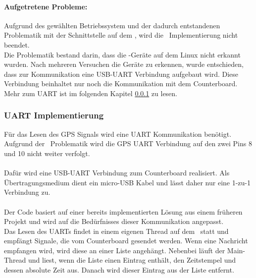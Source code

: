\paragraph{Aufgetretene Probleme:}
Aufgrund des gewählten Betriebssystem und der dadurch entstandenen Problematik mit der Schnittstelle auf dem \rpi, wird die \iic\ Implementierung nicht beendet.\\
Die Problematik bestand darin, dass die \iic-Geräte auf dem Linux nicht erkannt wurden. Nach mehreren Versuchen die Geräte zu erkennen, wurde entschieden, dass zur Kommunikation eine USB-UART Verbindung aufgebaut wird. Diese Verbindung beinhaltet nur noch die Kommunikation mit dem Counterboard. Mehr zum UART ist im folgenden Kapitel \ref{sec:uart} zu lesen.

\clearpage
\subsubsection{UART Implementierung}\label{sec:uart}
Für das Lesen des GPS Signals wird eine UART Kommunikation benötigt.
Aufgrund der \iic\ Problematik wird die GPS UART Verbindung auf den zwei Pins 8 und 10 nicht weiter verfolgt.\\
\\
Dafür wird eine USB-UART Verbindung zum Counterboard realisiert. Als Übertragungsmedium dient ein micro-USB Kabel und lässt daher nur eine 1-zu-1 Verbindung zu.\\
\\
Der Code basiert auf einer bereits implementierten Lösung aus einem früheren Projekt und wird auf die Bedürfnisses dieser Kommunikation angepasst.\\
Das Lesen des UARTs findet in einem eigenen Thread auf dem \rpi\ statt und empfängt Signale, die vom Counterboard gesendet werden. Wenn eine Nachricht empfangen wird, wird diese an einer Liste angehängt. Nebenbei läuft der Main-Thread und liest, wenn die Liste einen Eintrag enthält, den Zeitstempel und dessen absolute Zeit aus. Danach wird dieser Eintrag aus der Liste entfernt.